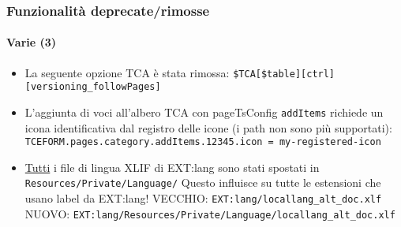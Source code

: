 \begin{frame}[fragile]
	\frametitle{Funzionalità deprecate/rimosse}
	\framesubtitle{Varie (3)}


	\begin{itemize}

		\item La seguente opzione TCA è stata rimossa:\newline
			\texttt{\$TCA[\$table][ctrl][versioning\_followPages]}

		\item L'aggiunta di voci all'albero TCA con pageTsConfig \texttt{addItems} richiede un icona identificativa
			dal registro delle icone (i path non sono più supportati):\newline
			\smaller
				\texttt{TCEFORM.pages.category.addItems.12345.icon = my-registered-icon}
			\normalsize

		\item \underline{Tutti} i file di lingua XLIF di EXT:lang sono stati spostati in\newline
			\texttt{Resources/Private/Language/}\newline
			Questo influisce su tutte le estensioni che usano label da EXT:lang!\newline
			\smaller
				VECCHIO: \texttt{EXT:lang/locallang\_alt\_doc.xlf}\newline
				NUOVO: \texttt{EXT:lang/Resources/Private/Language/locallang\_alt\_doc.xlf}
			\normalsize

	\end{itemize}

\end{frame}







